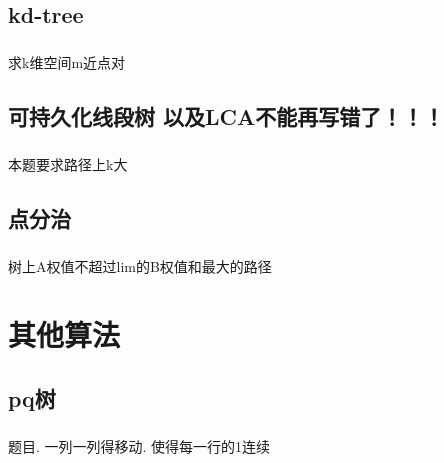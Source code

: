 \documentclass[landscape]{report}
\newcommand{\includecode}[2][c]{}
\begin{document}
\begin{flushleft}
\begin{multicols}{2}
\section{ kd-tree}
\paragraph{ }
求k维空间m近点对
\includecode[c++]{hdu4347.cpp} 
\section{可持久化线段树 以及LCA不能再写错了！！！}
\paragraph{ }
本题要求路径上k大
\includecode[c++]{COT.cpp}
\section{ 点分治}
\includecode[c++]{poj1741.cpp}
\paragraph{ }
树上A权值不超过lim的B权值和最大的路径
\includecode[c++]{poj1741.cpp}



\chapter{ 其他算法}
\section{pq树}
\paragraph{ }
	题目. 一列一列得移动. 使得每一行的1连续
	\includecode[c++]{cf243E.cpp}

\end{multicols}
\end{flushleft}
\end{document}
